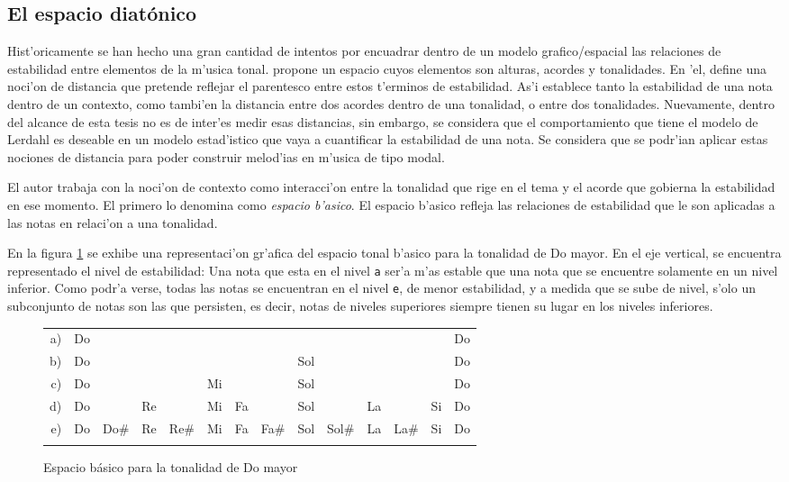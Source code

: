 \subsection{El espacio diat\'onico}
Hist'oricamente se han hecho una gran cantidad de intentos por encuadrar dentro de un modelo grafico/espacial las relaciones de estabilidad entre elementos de la m'usica
tonal.  \cite{Lerdahl2001} propone un espacio cuyos elementos son alturas, acordes y tonalidades. En 'el, define una noci'on de distancia que pretende 
reflejar el parentesco entre estos t'erminos de estabilidad. As'i establece tanto la estabilidad de una nota dentro de un contexto, 
como tambi'en la distancia entre dos acordes dentro de una tonalidad, o entre dos tonalidades. 
Nuevamente, dentro del alcance de esta tesis no es de inter'es medir esas distancias, sin embargo, se considera que el comportamiento que tiene el modelo de Lerdahl es deseable en un modelo estad'istico
que vaya a cuantificar la estabilidad de una nota. Se considera que se podr'ian aplicar estas nociones de distancia para poder construir melod'ias en m'usica de 
tipo modal.

El autor trabaja con la noci'on de contexto como interacci'on entre la tonalidad que rige en el tema  y el
acorde que gobierna la estabilidad en ese momento. El primero lo denomina como \emph{espacio b'asico}. 
El espacio b'asico refleja las relaciones de estabilidad que le son aplicadas a las notas en relaci'on a una tonalidad. 

En la figura \ref{fig:basic_space} se exhibe una representaci'on gr'afica del espacio tonal b'asico para la tonalidad de Do mayor. En el eje vertical, se encuentra
representado el nivel de estabilidad: Una nota que esta en el nivel \texttt{a} ser'a m'as estable que una nota que se encuentre solamente 
en un nivel inferior. Como 
podr'a verse, todas las notas se encuentran en el nivel \texttt{e}, de menor estabilidad, y a medida que se sube de nivel, s'olo un subconjunto de notas son las 
que persisten, es decir, notas de niveles superiores siempre tienen su lugar en los niveles inferiores.

\begin{figure}
\begin{center}
\begin{tabular}{r c c c c c c c c c c c c c} 
a) & Do &      &    &      &    &    &      &     &       &    &      &    & Do\\
b) & Do &      &    &      &    &    &      & Sol &       &    &      &    & Do\\
c) & Do &      &    &      & Mi &    &      & Sol &       &    &      &    & Do\\
d) & Do &      & Re &      & Mi & Fa &      & Sol &       & La &      & Si & Do\\
e) & Do & Do\# & Re & Re\# & Mi & Fa & Fa\# & Sol & Sol\# & La & La\# & Si & Do\\
\newline
\end{tabular}
\caption{ Espacio b\'asico para la tonalidad de Do mayor}
\label{fig:basic_space}
\end{center}
\end{figure}

